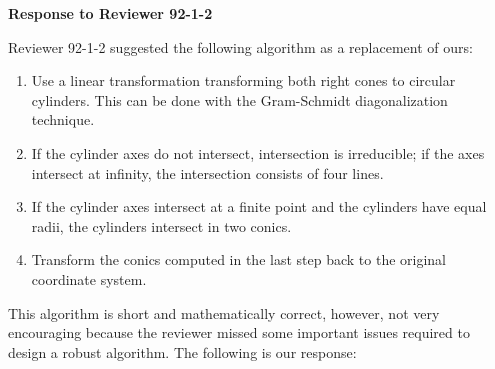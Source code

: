 
\newtheorem{example}{Example}[section]
\newtheorem{property}{Property}[section]
\newtheorem{definition}{Definition}[section]
\newtheorem{theorem}{Theorem}[section]
\newtheorem{lemma}{Lemma}[section]
\newtheorem{corollary}{Corollary}[section]
\newtheorem{remark}{Remark}[section]

\newcommand{\DoubleSpace}{\edef\baselinestretch{1.4}\Large\normalsize}
\newcommand{\QED}{\ \ \ \rule{2mm}{3mm}\\}
\newcommand{\arrow}[1]{\vec{\bf #1}}

\setlength{\oddsidemargin}{0pt}
\setlength{\evensidemargin}{0pt}
\setlength{\headsep}{0pt}
\setlength{\topmargin}{0pt}
\setlength{\textheight}{8.75in}
\setlength{\textwidth}{6.5in}



\begin{center}\Large\bf
     Response to Reviewer 92-1-2
\end{center}
\vspace{1cm}
     Reviewer 92-1-2 suggested the following algorithm as a replacement of
ours:
\begin{enumerate}
     \item\label{step-1}
          Use a linear transformation transforming both right cones to
          circular cylinders.
          This can be done with the Gram-Schmidt diagonalization technique.
     \item\label{step-2}
          If the cylinder axes do not intersect, intersection is irreducible;
          if the axes intersect at infinity, the intersection consists of four
          lines.
     \item\label{step-3}
          If the cylinder axes intersect at a finite point and the cylinders
          have equal radii, the cylinders intersect in two conics.
     \item\label{step-4}
          Transform the conics computed in the last step back to the original
          coordinate system.
\end{enumerate}

     This algorithm is short and mathematically correct, however, not very
encouraging because the reviewer missed some important issues required to design
a robust algorithm.  The following is our response:

